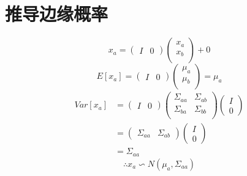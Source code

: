 \documentclass{report}
\begin{document}
\section{推导边缘概率}
$$
x_a = \left (\begin{matrix}I & 0\end{matrix}\right )\left (\begin{matrix}x_a \\x_b\\\end{matrix}\right ) + 0
$$
$$
E[x_a] = \left (\begin{matrix}I & 0\end{matrix}\right )\left (\begin{matrix}\mu_a \\\mu_b \\\end{matrix}\right ) = \mu_a
$$
$$
\begin{aligned}Var[x_a] &= \left (\begin{matrix}I & 0\end{matrix}\right )\left (\begin{matrix}\Sigma_{aa} & \Sigma_{ab} \\\Sigma_{ba} & \Sigma_{bb} \\\end{matrix}\right )\left (\begin{matrix}I \\0\end{matrix}\right ) \\&= \left (\begin{matrix}\Sigma_{aa} & \Sigma_{ab} \end{matrix}\right )\left (\begin{matrix}I \\0\end{matrix}\right )\\&=\Sigma_{aa}\end{aligned}
$$
$$
\therefore x_a \backsim N(\mu_a, \Sigma_{aa})
$$
\end{document}
